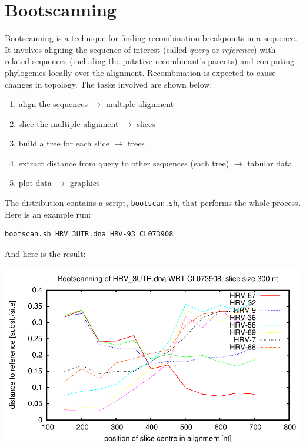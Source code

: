 \section{Bootscanning}
\label{sct_bootscanning}

Bootscanning is a technique for finding recombination breakpoints in a
sequence. It involves aligning the sequence of interest (called \emph{query} or
\emph{reference}) with related sequences (including the putative recombinant's
parents) and computing phylogenies locally over the alignment. Recombination is
expected to cause changes in topology.  The tasks involved are shown below:
\begin{enumerate}
\item align the sequences $\rightarrow$ multiple alignment
\item slice the multiple alignment $\rightarrow$ slices
\item build a tree for each slice $\rightarrow$ trees
\item extract distance from query to other sequences (each tree) $\rightarrow$ tabular data
\item plot data $\rightarrow$ graphics
\end{enumerate}
The distribution contains a script, \texttt{bootscan.sh}, that performs the whole process. Here is an example run:
\begin{verbatim}
bootscan.sh HRV_3UTR.dna HRV-93 CL073908
\end{verbatim}
And here is the result:

\begin{centering}
\includegraphics[scale=0.7]{bootscan_1.pdf}
\end{centering}
